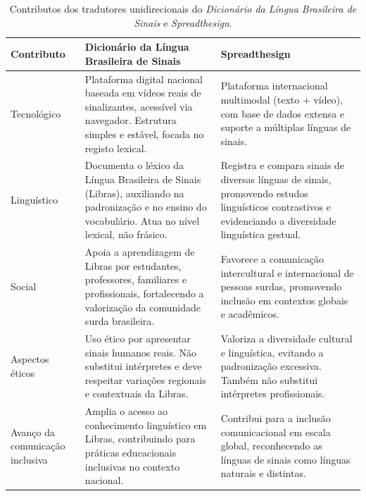 \documentclass[portuguese]{textolivre}
\begin{document}
\begin{table}[htbp]
\centering
\small
\caption{Contributos dos tradutores unidirecionais do \textit{Dicionário da Língua Brasileira de Sinais} e \textit{Spreadthesign}.}
\label{tab3}
\begin{threeparttable}

\begin{tabularx}{\textwidth}{@{}>{\raggedright\arraybackslash}p{2.5cm}
>{\raggedright\arraybackslash}X
>{\raggedright\arraybackslash}X@{}}

\toprule
Contributo &
Dicionário da Língua Brasileira de Sinais &
Spreadthesign \\
\midrule

Tecnológico &
Plataforma digital nacional baseada em vídeos reais de sinalizantes, acessível via navegador. Estrutura simples e estável, focada no registo lexical. &
Plataforma internacional multimodal (texto + vídeo), com base de dados extensa e suporte a múltiplas línguas de sinais. \\

\addlinespace

Linguístico &
Documenta o léxico da Língua Brasileira de Sinais (Libras), auxiliando na padronização e no ensino do vocabulário. Atua no nível lexical, não frásico. &
Registra e compara sinais de diversas línguas de sinais, promovendo estudos linguísticos contrastivos e evidenciando a diversidade linguística gestual. \\

\addlinespace

Social &
Apoia a aprendizagem de Libras por estudantes, professores, familiares e profissionais, fortalecendo a valorização da comunidade surda brasileira. &
Favorece a comunicação intercultural e internacional de pessoas surdas, promovendo inclusão em contextos globais e acadêmicos. \\

\addlinespace

Aspectos éticos &
Uso ético por apresentar sinais humanos reais. Não substitui intérpretes e deve respeitar variações regionais e contextuais da Libras. &
Valoriza a diversidade cultural e linguística, evitando a padronização excessiva. Também não substitui intérpretes profissionais. \\

\addlinespace

Avanço da comunicação inclusiva &
Amplia o acesso ao conhecimento linguístico em Libras, contribuindo para práticas educacionais inclusivas no contexto nacional. &
Contribui para a inclusão comunicacional em escala global, reconhecendo as línguas de sinais como línguas naturais e distintas. \\


\end{tabularx}
\end{threeparttable}
\end{table}
\end{document}
